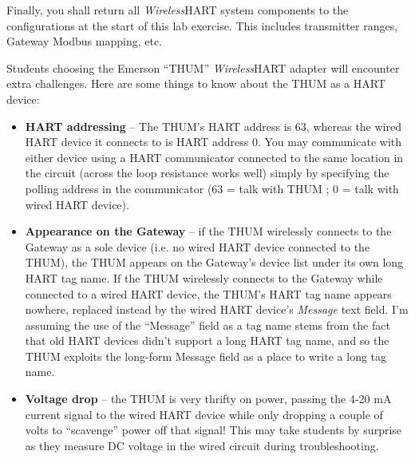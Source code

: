 \begin{itemize}
\vskip 10pt

Finally, you shall return all {\sl Wireless}HART system components to the configurations at the start of this lab exercise.  This includes transmitter ranges, Gateway Modbus mapping, etc.















Students choosing the Emerson ``THUM'' {\sl Wireless}HART adapter will encounter extra challenges.  Here are some things to know about the THUM as a HART device:

\begin{itemize}
\item{} {\bf HART addressing} -- The THUM's HART address is 63, whereas the wired HART device it connects to is HART address 0.  You may communicate with either device using a HART communicator connected to the same location in the circuit (across the loop resistance works well) simply by specifying the polling address in the communicator (63 = talk with THUM ; 0 = talk with wired HART device).
\vskip 10pt
\item{} {\bf Appearance on the Gateway} -- if the THUM wirelessly connects to the Gateway as a sole device (i.e. no wired HART device connected to the THUM), the THUM appears on the Gateway's device list under its own long HART tag name.  If the THUM wirelessly connects to the Gateway while connected to a wired HART device, the THUM's HART tag name appears nowhere, replaced instead by the wired HART device's {\it Message} text field.  I'm assuming the use of the ``Message'' field as a tag name stems from the fact that old HART devices didn't support a long HART tag name, and so the THUM exploits the long-form Message field as a place to write a long tag name.
\vskip 10pt
\item{} {\bf Voltage drop} -- the THUM is very thrifty on power, passing the 4-20 mA current signal to the wired HART device while only dropping a couple of volts to ``scavenge'' power off that signal!  This may take students by surprise as they measure DC voltage in the wired circuit during troubleshooting.
\end{itemize}















\end{itemize}
